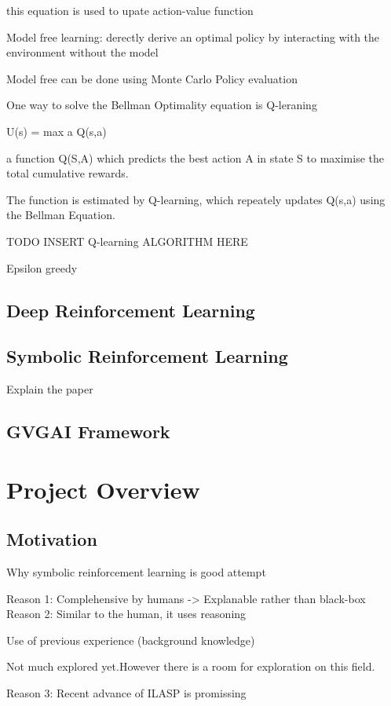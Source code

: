 \documentclass[12pt,twoside]{report}
\begin{document}
this equation is used to upate action-value function

Model free learning: derectly derive an optimal policy by interacting with the environment without the model

Model free can be done using Monte Carlo Policy evaluation

One way to solve the Bellman Optimality equation is Q-leraning

U(s) = max a Q(s,a)


a function Q(S,A) which predicts the best action A in state S to maximise the total cumulative rewards.

The function is estimated by Q-learning, which repeately updates Q(s,a) using
the Bellman Equation.

TODO INSERT Q-learning ALGORITHM HERE


Epsilon greedy

\section{Deep
Reinforcement Learning}

\section{Symbolic Reinforcement Learning}


Explain the paper
\section{GVGAI Framework}


\chapter{Project Overview}
\section{Motivation}

Why symbolic reinforcement learning is good attempt


Reason 1: Complehensive by humans -> Explanable rather than black-box
Reason 2: Similar to the human, it uses reasoning

Use of previous experience (background knowledge)

Not much explored yet.However there is a room for exploration on this field.

Reason 3: Recent advance of ILASP is promissing
\end{document}
